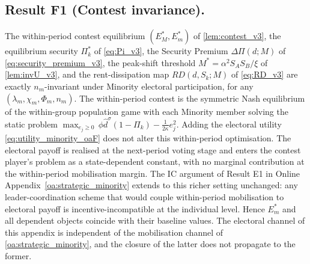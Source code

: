 \documentclass[11pt,twoside]{extarticle}
\begin{document}
\subsection*{Result F1 (Contest invariance).} The within-period contest equilibrium $(E_M^*,E_m^*)$ of \autoref{lem:contest_v3}, the equilibrium security $\Pi_k^*$ of \autoref{eq:Pi_v3}, the Security Premium $\Delta\Pi(d;M)$ of \autoref{eq:security_premium_v3}, the peak-shift threshold $M^*=\alpha^2 S_AS_B/\xi$ of \autoref{lem:invU_v3}, and the rent-dissipation map $RD(d,S_k;M)$ of \autoref{eq:RD_v3} are exactly $n_m$-invariant under Minority electoral participation, for any $(\lambda_m,\chi_m,\Phi_m,n_m)$. The within-period contest is the symmetric Nash equilibrium of the within-group population game with each Minority member solving the static problem $\max_{e_j\ge 0}\,\phi\hat d^\sigma(1-\Pi_k)-\tfrac{1}{2\kappa}e_j^2$. Adding the electoral utility \autoref{eq:utility_minority_oaF} does not alter this within-period optimisation. The electoral payoff is realised at the next-period voting stage and enters the contest player's problem as a state-dependent constant, with no marginal contribution at the within-period mobilisation margin. The IC argument of Result E1 in Online Appendix~\ref{oa:strategic_minority} extends to this richer setting unchanged: any leader-coordination scheme that would couple within-period mobilisation to electoral payoff is incentive-incompatible at the individual level. Hence $E_m^*$ and all dependent objects coincide with their baseline values. The electoral channel of this appendix is independent of the mobilisation channel of \autoref{oa:strategic_minority}, and the closure of the latter does not propagate to the former.
\end{document}
